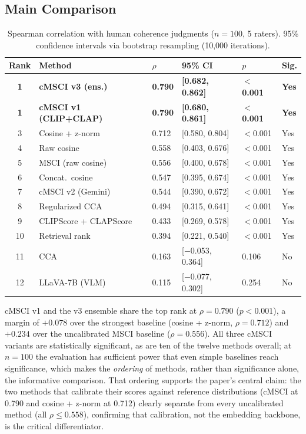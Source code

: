 \subsection{Main Comparison}\label{sec:main-comparison}

\begin{table}[t]
\caption{Spearman correlation with human coherence judgments ($n = 100$, 5 raters). 95\% confidence intervals via bootstrap resampling (10,000 iterations).}\label{tab:main-comparison}
\centering
\small
\begin{tabular}{clllll}
\toprule
Rank & Method & $\rho$ & 95\% CI & $p$ & Sig. \\
\midrule
\textbf{1} & \textbf{cMSCI v3 (ens.)} & \textbf{0.790} & \textbf{[0.682, 0.862]} & \textbf{$<$0.001} & \textbf{Yes} \\
\textbf{1} & \textbf{cMSCI v1 (CLIP+CLAP)} & \textbf{0.790} & \textbf{[0.680, 0.861]} & \textbf{$<$0.001} & \textbf{Yes} \\
3 & Cosine + z-norm & 0.712 & [0.580, 0.804] & $<$0.001 & Yes \\
4 & Raw cosine & 0.558 & [0.403, 0.676] & $<$0.001 & Yes \\
5 & MSCI (raw cosine) & 0.556 & [0.400, 0.678] & $<$0.001 & Yes \\
6 & Concat.\ cosine & 0.547 & [0.395, 0.674] & $<$0.001 & Yes \\
7 & cMSCI v2 (Gemini) & 0.544 & [0.390, 0.672] & $<$0.001 & Yes \\
8 & Regularized CCA & 0.494 & [0.315, 0.641] & $<$0.001 & Yes \\
9 & CLIPScore + CLAPScore & 0.433 & [0.269, 0.578] & $<$0.001 & Yes \\
10 & Retrieval rank & 0.394 & [0.221, 0.540] & $<$0.001 & Yes \\
11 & CCA & 0.163 & [$-$0.053, 0.364] & 0.106 & No \\
12 & LLaVA-7B (VLM) & 0.115 & [$-$0.077, 0.302] & 0.254 & No \\
\bottomrule
\end{tabular}
\end{table}

cMSCI v1 and the v3 ensemble share the top rank at $\rho = 0.790$ ($p < 0.001$), a margin of $+0.078$ over the strongest baseline (cosine + z-norm, $\rho = 0.712$) and $+0.234$ over the uncalibrated MSCI baseline ($\rho = 0.556$). All three cMSCI variants are statistically significant, as are ten of the twelve methods overall; at $n = 100$ the evaluation has sufficient power that even simple baselines reach significance, which makes the \emph{ordering} of methods, rather than significance alone, the informative comparison. That ordering supports the paper's central claim: the two methods that calibrate their scores against reference distributions (cMSCI at 0.790 and cosine + z-norm at 0.712) clearly separate from every uncalibrated method (all $\rho \leq 0.558$), confirming that calibration, not the embedding backbone, is the critical differentiator.

